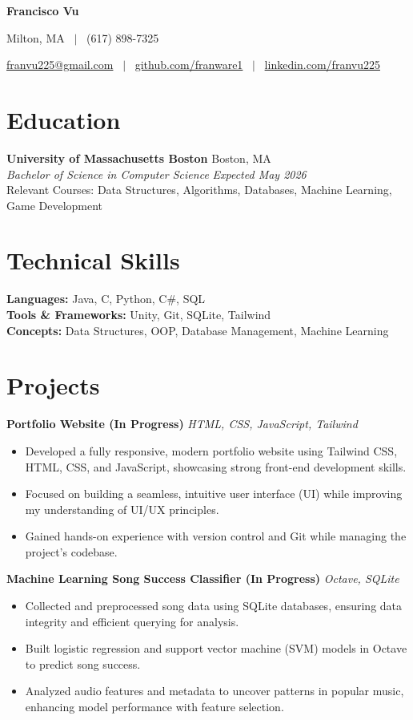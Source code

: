 \documentclass[a4paper,10pt]{article}
\begin{document}
\centerline{\huge \bf Francisco Vu}
\centerline{Milton, MA \ $|$ \ (617) 898-7325}
\centerline{\href{mailto:franvu225@gmail.com}{franvu225@gmail.com} \ $|$ \ \href{https://github.com/franware1}{github.com/franware1} \ $|$ \ \href{https://linkedin.com/franvu225}{linkedin.com/franvu225}}

\section*{Education}

\textbf{University of Massachusetts Boston} \hfill Boston, MA \\
\textit{Bachelor of Science in Computer Science} \hfill \textit{Expected May 2026} \\
Relevant Courses: Data Structures, Algorithms, Databases, Machine Learning, Game Development

\section*{Technical Skills}
\textbf{Languages:} Java, C, Python, C\#, SQL \\
\textbf{Tools \& Frameworks:} Unity, Git, SQLite, Tailwind \\
\textbf{Concepts:} Data Structures, OOP, Database Management, Machine Learning

\section*{Projects}

\noindent\textbf{Portfolio Website (In Progress)} \hfill \textit{HTML, CSS, JavaScript, Tailwind}
\vspace{-5pt}
\begin{itemize}[leftmargin=1.5em, label={-}]
    \item Developed a fully responsive, modern portfolio website using Tailwind CSS, HTML, CSS, and JavaScript, showcasing strong front-end development skills.
    \item Focused on building a seamless, intuitive user interface (UI) while improving my understanding of UI/UX principles.
    \item Gained hands-on experience with version control and Git while managing the project's codebase.
\end{itemize}

\noindent\textbf{Machine Learning Song Success Classifier (In Progress)} \hfill \textit{Octave, SQLite} \\
\vspace{-10pt}
\begin{itemize}[leftmargin=1.5em, label={-}]
  \item Collected and preprocessed song data using SQLite databases, ensuring data integrity and efficient querying for analysis.
  \item Built logistic regression and support vector machine (SVM) models in Octave to predict song success.
  \item Analyzed audio features and metadata to uncover patterns in popular music, enhancing model performance with feature selection.
\end{itemize}
\end{document}
